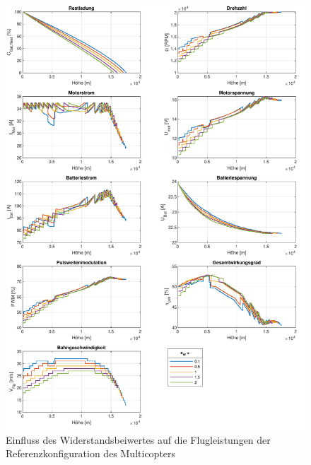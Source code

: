 \begin{figure}[H]
\centering
	\includegraphics[scale=0.7]{Diagramme/Untersuchung_c_W.pdf}
	\caption{Einfluss des Widerstandsbeiwertes auf die Flugleistungen der Referenzkonfiguration des Multicopters}
	\label{abb:c_W_einfluss}
\end{figure}


